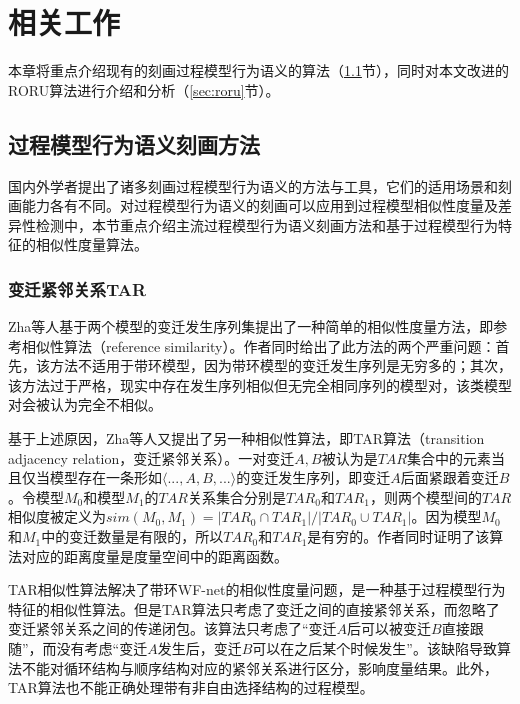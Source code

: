 
\chapter{相关工作}\label{cha:related_work}
本章将重点介绍现有的刻画过程模型行为语义的算法（\ref{sec:related_algorithms}节），同时对本文改进的RORU算法进行介绍和分析（\ref{sec:roru}节）。

\section{过程模型行为语义刻画方法}\label{sec:related_algorithms}
国内外学者提出了诸多刻画过程模型行为语义的方法与工具，它们的适用场景和刻画能力各有不同。对过程模型行为语义的刻画可以应用到过程模型相似性度量及差异性检测中，本节重点介绍主流过程模型行为语义刻画方法和基于过程模型行为特征的相似性度量算法。

\subsection{变迁紧邻关系TAR}\label{subsec:tar}
Zha等人基于两个模型的变迁发生序列集提出了一种简单的相似性度量方法，即参考相似性算法（reference similarity）\cite{zha2010workflow}。作者同时给出了此方法的两个严重问题：首先，该方法不适用于带环模型，因为带环模型的变迁发生序列是无穷多的；其次，该方法过于严格，现实中存在发生序列相似但无完全相同序列的模型对，该类模型对会被认为完全不相似。

基于上述原因，Zha等人又提出了另一种相似性算法，即TAR算法（transition adjacency relation，变迁紧邻关系）。一对变迁$A,B$被认为是$TAR$集合中的元素当且仅当模型存在一条形如$\langle ...,A,B,...\rangle$的变迁发生序列，即变迁$A$后面紧跟着变迁$B$。令模型$M_{0}$和模型$M_{1}$的$TAR$关系集合分别是$TAR_{0}$和$TAR_{1}$，则两个模型间的$TAR$相似度被定义为$sim(M_{0},M_{1})=|TAR_{0}\cap TAR_{1}|/|TAR_{0}\cup TAR_{1}|$。因为模型$M_{0}$和$M_{1}$中的变迁数量是有限的，所以$TAR_{0}$和$TAR_{1}$是有穷的。作者同时证明了该算法对应的距离度量是度量空间中的距离函数。

TAR相似性算法解决了带环WF-net的相似性度量问题，是一种基于过程模型行为特征的相似性算法。但是TAR算法只考虑了变迁之间的直接紧邻关系，而忽略了变迁紧邻关系之间的传递闭包。该算法只考虑了“变迁$A$后可以被变迁$B$直接跟随”，而没有考虑“变迁$A$发生后，变迁$B$可以在之后某个时候发生”。该缺陷导致算法不能对循环结构与顺序结构对应的紧邻关系进行区分，影响度量结果。此外，TAR算法也不能正确处理带有非自由选择结构的过程模型。

